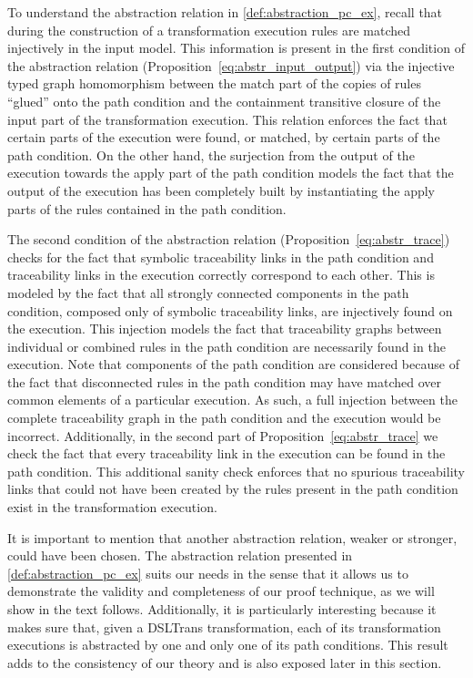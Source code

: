 To understand the abstraction relation in \cref{def:abstraction_pc_ex}, recall
that during the construction of a transformation execution rules are matched
injectively in the input model. This information is present in the first
condition of the abstraction relation (Proposition~\ref{eq:abstr_input_output})
via the injective typed graph homomorphism between the match part of the copies
of rules ``glued'' onto the path condition and the containment transitive
closure of the input part of the transformation execution. This relation
enforces the fact that certain parts of the execution were found, or matched, by
certain parts of the path condition.
On the other hand, the surjection from the output of the execution towards the
apply part of the path condition models the fact that the output of the
execution has been completely built by instantiating the apply parts of the
rules contained in the path condition.

The second condition of the abstraction relation
(Proposition~\ref{eq:abstr_trace}) checks for the fact that symbolic
traceability links in the path condition and traceability links in the execution
correctly correspond to each other. This is modeled by the fact that all
strongly connected components in the path condition, composed only of symbolic
traceability links, are injectively found on the execution. This injection
models the fact that traceability graphs between individual or combined rules in
the path condition are necessarily found in the execution. Note that components
of the path condition are considered because of the fact that disconnected rules
in the path condition may have matched over common elements of a particular
execution. As such, a full injection between the complete traceability graph in
the path condition and the execution would be incorrect. Additionally, in the
second part of Proposition~\ref{eq:abstr_trace} we check the fact that every
traceability link in the execution can be found in the path condition. This
additional sanity check enforces that no spurious traceability links that could
not have been created by the rules present in the path condition exist in the
transformation execution.


It is important to mention that another abstraction relation, weaker or
stronger, could have been chosen. The abstraction relation presented in
\cref{def:abstraction_pc_ex} suits our needs in the sense that it allows us to
demonstrate the validity and completeness of our proof technique, as we will
show in the text follows. Additionally, it is particularly interesting because
it makes sure that, given a DSLTrans transformation, each of its transformation
executions is abstracted by one and only one of its path conditions. This result
adds to the consistency of our theory and is also exposed later in this section.



